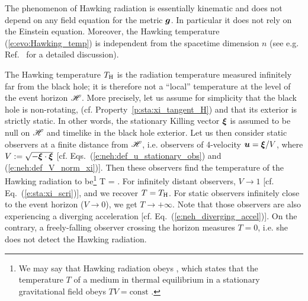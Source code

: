 \begin{remark}
The phenomenon of Hawking radiation is essentially kinematic and does not depend on any field equation for the
metric $\bm{g}$. In particular it does not rely on the Einstein equation.
Moreover, the Hawking temperature (\ref{e:evo:Hawking_temp}) is independent from the spacetime dimension
$n$ (see e.g. Ref.~\cite{KantiW15} for a detailed discussion).
\end{remark}

\begin{remark}\label{r:evo:local_Hawking_rad}
The Hawking temperature $T_{\rm H}$ is the radiation temperature measured
infinitely far from the black hole; it is therefore not a ``local'' temperature
at the level of the event horizon $\mathscr{H}$.
More precisely, let us assume for simplicity that the black hole is non-rotating,
(cf. Property~\ref{p:sta:xi_tangent_H}) and that its exterior is strictly static. In other words,
the stationary Killing vector $\bm{\xi}$ is assumed to be null on $\mathscr{H}$  and
timelike in the black hole exterior. Let us then consider static observers at a finite distance
from $\mathscr{H}$, i.e. observers
of 4-velocity $\bm{u} = \bm{\xi} / V$, where $V := \sqrt{-\bm{\xi}\cdot\bm{\xi}}$
[cf. Eqs.~(\ref{e:neh:def_u_stationary_obs}) and (\ref{e:neh:def_V_norm_xi})].
Then these observers find the temperature of the Hawking radiation to
be\footnote{We may say
that Hawking radiation obeys , which
states that the temperature $T$ of a medium in thermal equilibrium in a stationary gravitational field
obeys $T V = \mathrm{const}$ \cite{SantiV19}.}
\be \label{e:evo:Hawking_temp_local}
    T =  .
\ee
For infinitely distant observers, $V\to 1$ [cf. Eq.~(\ref{e:sta:xi_scri})], and we recover $T=T_{\rm H}$.
For static observers infinitely close to the event horizon ($V\to 0$), we get
$T\to +\infty$. Note that those observers are
also experiencing a diverging acceleration [cf. Eq.~(\ref{e:neh_diverging_accel})].
On the contrary, a freely-falling observer crossing the horizon measures
$T=0$, i.e. she does not detect the Hawking radiation.
\end{remark}

